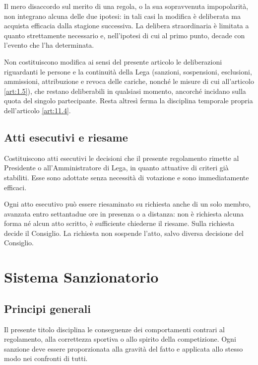 Il mero disaccordo sul merito di una regola, o la sua sopravvenuta impopolarità, non integrano alcuna delle due ipotesi: in tali casi la modifica è deliberata ma acquista efficacia dalla stagione successiva. La delibera straordinaria è limitata a quanto strettamente necessario e, nell'ipotesi di cui al primo punto, decade con l'evento che l'ha determinata.

Non costituiscono modifica ai sensi del presente articolo le deliberazioni riguardanti le persone e la continuità della Lega (sanzioni, sospensioni, esclusioni, ammissioni, attribuzione e revoca delle cariche, nonché le misure di cui all'articolo \ref{art:1.5}), che restano deliberabili in qualsiasi momento, ancorché incidano sulla quota del singolo partecipante. Resta altresì ferma la disciplina temporale propria dell'articolo \ref{art:11.4}.

\section{Atti esecutivi e riesame}
\label{art:2.7}

Costituiscono atti esecutivi le decisioni che il presente regolamento rimette al Presidente o all'Amministratore di Lega, in quanto attuative di criteri già stabiliti. Esse sono adottate senza necessità di votazione e sono immediatamente efficaci.

Ogni atto esecutivo può essere riesaminato su richiesta anche di un solo membro, avanzata entro settantadue ore in presenza o a distanza: non è richiesta alcuna forma né alcun atto scritto, è sufficiente chiederne il riesame. Sulla richiesta decide il Consiglio. La richiesta non sospende l'atto, salvo diversa decisione del Consiglio.


\chapter{Sistema Sanzionatorio}
\label{cap:sistema-sanzionatorio}

\section{Principi generali}
\label{art:3.1}

Il presente titolo disciplina le conseguenze dei comportamenti contrari al regolamento, alla correttezza sportiva o allo spirito della competizione. Ogni sanzione deve essere proporzionata alla gravità del fatto e applicata allo stesso modo nei confronti di tutti.

